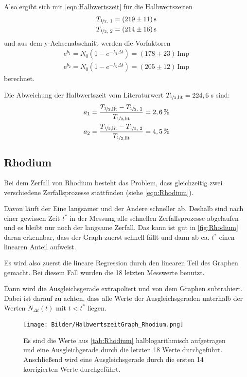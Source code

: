 \documentclass[titlepage = firstcover]{scrartcl}
\begin{document}
            Also ergibt sich mit \autoref{eqn:Halbwertszeit} für die Halbwertszeiten
            \begin{align*}
                T_{\nicefrac{1}{2} \text{, 1}} = (219 \pm 11)\, \text{s} \\
                T_{\nicefrac{1}{2} \text{, 2}} = (214 \pm 16)\, \text{s}
            \end{align*}
            und aus dem y-Achsenabschnitt werden die Vorfaktoren
            \begin{align*}
                \text{e}^{b_1} = N_0 \left(1 - e^{-\lambda_1 \Delta t}\right) = (178 \pm 23) \,\text{Imp} \\
                \text{e}^{b_2} = N_0 \left(1 - e^{-\lambda_2 \Delta t}\right) = (205 \pm 12) \,\text{Imp}
            \end{align*}
            berechnet.

            Die Abweichung der Halbwertszeit vom Literaturwert $T_{\nicefrac{1}{2} \text{,lit}} = 224,6 \,$s sind:
            \begin{align*}
                a_1 = \frac{T_{\nicefrac{1}{2} \text{,lit}} - T_{\nicefrac{1}{2} \text{, 1}}}{T_{\nicefrac{1}{2} \text{,lit}}} = 2,6 \, \% \\
                a_2 = \frac{T_{\nicefrac{1}{2} \text{,lit}} - T_{\nicefrac{1}{2} \text{, 2}}}{T_{\nicefrac{1}{2} \text{,lit}}} = 4,5 \, \%
            \end{align*}
        
        \newpage
        \subsection{Rhodium}
            Bei dem Zerfall von Rhodium besteht das Problem, dass gleichzeitig zwei verschiedene Zerfallsprozesse stattfinden (siehe \autoref{eqn:Rhodium}).

            Davon läuft der Eine langsamer und der Andere schneller ab. Deshalb sind nach einer gewissen Zeit $t^*$ in der Messung alle schnellen Zerfallsprozesse abgelaufen und es bleibt nur noch der langsame Zerfall. Das kann ist gut in \autoref{fig:Rhodium} daran erkennbar, dass der Graph zuerst schnell fällt und dann ab ca. $t^*$ einen linearen Anteil aufweist.

            Es wird also zuerst die lineare Regression durch den linearen Teil des Graphen gemacht. Bei diesem Fall wurden die 18 letzten Messwerte benutzt.

            Dann wird die Ausgleichsgerade extrapoliert und von dem Graphen subtrahiert. Dabei ist darauf zu achten, dass alle Werte der Ausgleichsgeraden unterhalb der Werten $N_{\Delta t}(t)$ mit $t < t^*$ liegen.
            \begin{figure}[h]
                \centering
                \texttt{[image: Bilder/HalbwertszeitGraph\_Rhodium.png]}
                \caption{Es sind die Werte aus \autoref{tab:Rhodium} halblogarithmisch aufgetragen und eine Ausgleichgerade durch die letzten 18 Werte durchgeführt. Anschließend wird eine Ausgleichsgerade durch die ersten 14 korrigierten Werte durchgeführt.}
                \label{fig:Rhodium}
            \end{figure}
\end{document}
